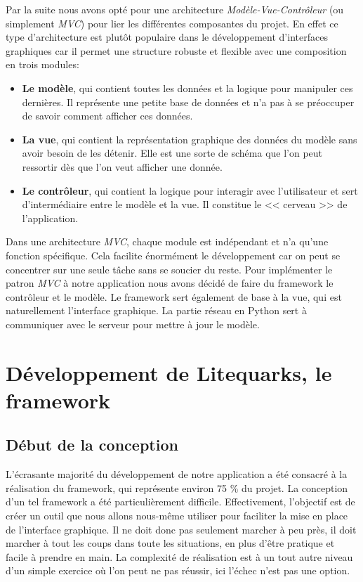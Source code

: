 \documentclass[twoside]{report}
\begin{document}
Par la suite nous avons opté pour une architecture \textit{Modèle-Vue-Contrôleur} (ou simplement \textit{MVC}) pour lier les différentes composantes du projet. En effet ce type d'architecture est plutôt populaire dans le développement d'interfaces graphiques car il permet une structure robuste et flexible avec une composition en trois modules:
\begin{itemize}[label=$-$, leftmargin=1.5cm]
    \setlength\itemsep{0em}
    \item \textbf{Le modèle}, qui contient toutes les données et la logique pour manipuler ces dernières. Il représente une petite base de données et n'a pas à se préoccuper de savoir comment afficher ces données.
    \item \textbf{La vue}, qui contient la représentation graphique des données du modèle sans avoir besoin de les détenir. Elle est une sorte de schéma que l'on peut ressortir dès que l'on veut afficher une donnée.
    \item \textbf{Le contrôleur}, qui contient la logique pour interagir avec l'utilisateur et sert d'intermédiaire entre le modèle et la vue. Il constitue le << cerveau >> de l'application.
\end{itemize}

Dans une architecture \textit{MVC}, chaque module est indépendant et n'a qu'une fonction spécifique. Cela facilite énormément le développement car on peut se concentrer sur une seule tâche sans se soucier du reste. Pour implémenter le patron \textit{MVC} à notre application nous avons décidé de faire du framework le contrôleur et le modèle. Le framework sert également de base à la vue, qui est naturellement l'interface graphique. La partie réseau en Python sert à communiquer avec le serveur pour mettre à jour le modèle.

\section{Développement de Litequarks, le framework}
\subsection{Début de la conception}

L'écrasante majorité du développement de notre application a été consacré à la réalisation du framework, qui représente environ 75 \% du projet. La conception d'un tel framework a été particulièrement difficile. Effectivement, l'objectif est de créer un outil que nous allons nous-même utiliser pour faciliter la mise en place de l'interface graphique. Il ne doit donc pas seulement marcher à peu près, il doit marcher à tout les coups dans toute les situations, en plus d'être pratique et facile à prendre en main. La complexité de réalisation est à un tout autre niveau d'un simple exercice où l'on peut ne pas réussir, ici l'échec n'est pas une option.\\
\end{document}
